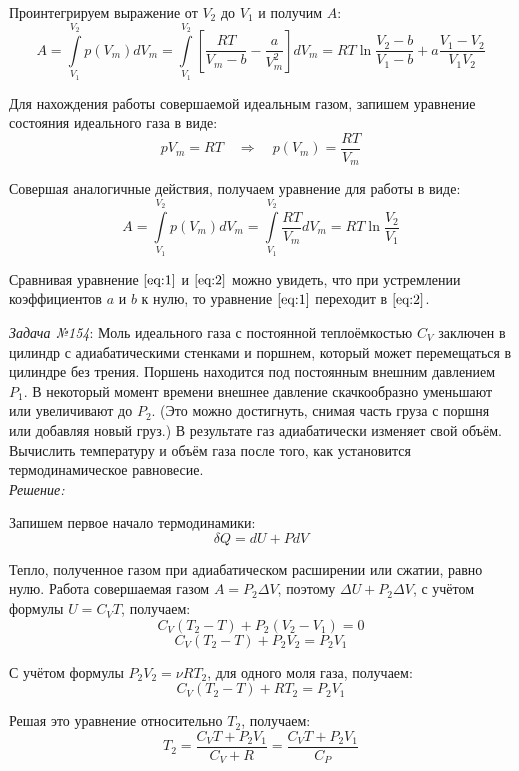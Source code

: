 \documentclass[14pt,final,titlepage,pscyr]{hedsemwork}
\begin{document}
Проинтегрируем выражение от \( V_2 \) до \( V_1 \) и получим \( A \):
\begin{equation}
	A = \int\limits_{V_1}^{V_2} p(V_m) dV_m = 
		\int\limits_{V_1}^{V_2} \left[ 
			\frac{RT}{V_m - b} - \frac{a}{V^2_m}
		\right] dV_m = 
		RT\ln\frac{V_2 - b}{V_1 - b} + a\frac{V_1 - V_2}{V_1 V_2}
	\label{eq:1}
\end{equation}

Для нахождения работы совершаемой идеальным газом, запишем уравнение 
состояния идеального газа в виде:
\[
	pV_m = RT \quad\Rightarrow\quad p(V_m) = \frac{RT}{V_m} 
\]

Совершая аналогичные действия, получаем уравнение для работы в виде:
\begin{equation}
	A = \int\limits_{V_1}^{V_2} p(V_m) dV_m = 
		\int\limits_{V_1}^{V_2} \frac{RT}{V_m} dV_m = 
		RT\ln\frac{V_2}{V_1}
	\label{eq:2}
\end{equation}

Сравнивая уравнение \( \ref{eq:1} \) и \( \ref{eq:2} \) можно увидеть, что 
при устремлении коэффициентов \( a \) и \( b \) к нулю, то уравнение 
\( \ref{eq:1} \) переходит в \( \ref{eq:2} \).

\newpage
\emph{Задача №154}: Моль идеального газа с постоянной теплоёмкостью 
\( C_V \) заключен в цилиндр с адиабатическими стенками и поршнем, который 
может перемещаться в цилиндре без трения. Поршень находится под постоянным 
внешним давлением \( P_1 \). В некоторый момент времени внешнее давление 
скачкообразно уменьшают или увеличивают до \( P_2 \). (Это можно 
достигнуть, снимая часть груза с поршня или добавляя новый груз.) В 
результате газ адиабатически изменяет свой объём. Вычислить температуру и 
объём газа после того, как установится термодинамическое равновесие. \\

\emph{Решение:}

Запишем первое начало термодинамики:
\[
	\delta Q = dU + PdV
\]

Тепло, полученное газом при адиабатическом расширении или сжатии, равно нулю. 
Работа совершаемая газом \( A = P_2 \Delta V \), поэтому 
\( \Delta U + P_2 \Delta V \), с учётом формулы \( U = C_V T \), получаем:
\[
	C_V( T_2 - T ) + P_2 ( V_2 - V_1 ) = 0
\]
\[
	C_V( T_2 - T ) + P_2 V_2 = P_2 V_1
\]

С учётом формулы \( P_2 V_2 = \nu RT_2 \), для одного моля газа, получаем:
\[
	C_V( T_2 - T ) + RT_2 = P_2 V_1
\]

Решая это уравнение относительно \( T_2 \), получаем:
\[
	T_2 = \frac{C_V T + P_2 V_1}{C_V + R} = \frac{C_V T + P_2 V_1}{C_P}
\]
\end{document}
